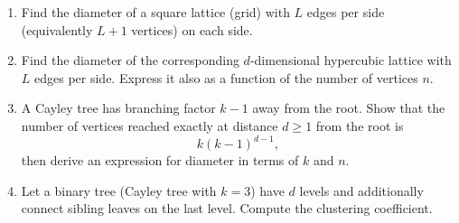 \documentclass[10pt]{article}
\begin{document}
\begin{enumerate}[resume]
\item Find the diameter of a square lattice (grid) with $L$ edges per side (equivalently $L+1$ vertices) on each side.

\item Find the diameter of the corresponding $d$-dimensional hypercubic lattice with $L$ edges per side. Express it also as a function of the number of vertices $n$.

\item A Cayley tree has branching factor $k-1$ away from the root. Show that the number of vertices reached exactly at distance $d\ge 1$ from the root is
\[
k(k-1)^{d-1},
\]
then derive an expression for diameter in terms of $k$ and $n$.

\item Let a binary tree (Cayley tree with $k=3$) have $d$ levels and additionally connect sibling leaves on the last level. Compute the clustering coefficient.

\end{enumerate}
\end{document}
